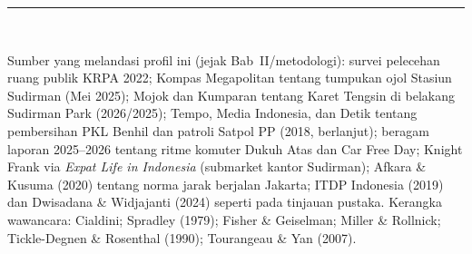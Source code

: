 \documentclass[11pt,a4paper]{report}
\begin{document}
\bigskip
\noindent\rule{\textwidth}{0.4pt}\\
{\footnotesize Sumber yang melandasi profil ini (jejak Bab~II/metodologi): survei pelecehan
ruang publik KRPA 2022; Kompas Megapolitan tentang tumpukan ojol Stasiun Sudirman (Mei 2025);
Mojok dan Kumparan tentang Karet Tengsin di belakang Sudirman Park (2026/2025); Tempo, Media
Indonesia, dan Detik tentang pembersihan PKL Benhil dan patroli Satpol PP (2018, berlanjut);
beragam laporan 2025--2026 tentang ritme komuter Dukuh Atas dan Car Free Day; Knight Frank via
\emph{Expat Life in Indonesia} (submarket kantor Sudirman); Afkara \& Kusuma (2020) tentang norma
jarak berjalan Jakarta; ITDP Indonesia (2019) dan Dwisadana \& Widjajanti (2024) seperti pada
tinjauan pustaka. Kerangka wawancara: Cialdini; Spradley (1979); Fisher \& Geiselman; Miller \&
Rollnick; Tickle-Degnen \& Rosenthal (1990); Tourangeau \& Yan (2007).\par}
\end{document}
